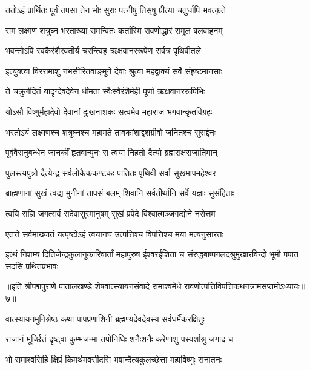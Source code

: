 \twolineshloka
{ततोऽहं प्रार्थितः पूर्वं तपसा तेन भोः सुराः}
{पत्नीषु तिसृषु प्रीत्या चतुर्धापि भवत्कृते}%

\twolineshloka
{राम लक्ष्मण शत्रुघ्न भरताख्या समन्वितः}
{कर्तास्मि रावणोद्धारं समूल बलवाहनम्}%

\twolineshloka
{भवन्तोऽपि स्वकैरंशैरवतीर्य चरन्त्विह}
{ऋक्षवानररूपेण सर्वत्र पृथिवीतले}%

\twolineshloka
{इत्युक्त्वा विररामाशु नभसीरितवाङ्मुने}
{देवाः श्रुत्वा महद्वाक्यं सर्वे संहृष्टमानसाः}%

\twolineshloka
{ते चक्रुर्गदितं यादृग्देवदेवेन धीमता}
{स्वैःस्वैरंशैर्मही पूर्णा ऋक्षवानररूपिभिः}%

\twolineshloka
{योऽसौ विष्णुर्महादेवो देवानां दुःखनाशकः}
{सत्वमेव महाराज भगवान्कृतविग्रहः}%

\twolineshloka
{भरतोऽयं लक्ष्मणश्च शत्रुघ्नश्च महामते}
{तावकांशाद्दशग्रीवो जनितश्च सुरार्द्दनः}%

\twolineshloka
{पूर्ववैरानुबन्धेन जानकीं हृतवान्पुनः}
{स त्वया निहतो दैत्यो ब्रह्मराक्षसजातिमान्}%

\twolineshloka
{पुलस्त्यपुत्रो दैत्येन्द्र सर्वलोकैककण्टकः}
{पातितः पृथिवी सर्वा सुखमापमहेश्वर}%

\twolineshloka
{ब्राह्मणानां सुखं त्वद्य मुनीनां तापसं बलम्}
{शिवानि सर्वतीर्थानि सर्वे यज्ञाः सुसंहिताः}%

\twolineshloka
{त्वयि राज्ञि जगत्सर्वं सदेवासुरमानुषम्}
{सुखं प्रपेदे विश्वात्मञ्जगद्योने नरोत्तम}%

\twolineshloka
{एतत्ते सर्वमाख्यातं यत्पृष्टोऽहं त्वयानघ}
{उत्पत्तिश्च विपत्तिश्च मया मत्यनुसारतः}%

\twolineshloka
{इत्थं निशम्य दितिजेन्द्रकुलानुकारिवार्तां महापुरुष ईश्वरईशिता च}
{संरुद्धबाष्पगलदश्रुमुखारविन्दो भूमौ पपात सदसि प्रथितप्रभावः}%

॥इति श्रीपद्मपुराणे पातालखण्डे शेषवात्स्यायनसंवादे रामाश्वमेधे रावणोत्पत्तिविपत्तिकथनन्नामसप्तमोऽध्यायः॥७॥



\twolineshloka
{वात्स्यायनमुनिश्रेष्ठ कथा पापप्रणाशिनी}
{ब्रह्मण्यदेवदेवस्य सर्वधर्मैकरक्षितुः}%

\twolineshloka
{राजानं मूर्च्छितं दृष्ट्वा कुम्भजन्मा तपोनिधिः}
{शनैःशनैः करेणाशु पस्पर्शाश्रु जगाद च}%

\twolineshloka
{भो रामाश्वसिहि क्षिप्रं किमर्थमवसीदसि}
{भवान्दैत्यकुलच्छेत्ता महाविष्णुः सनातनः}%

